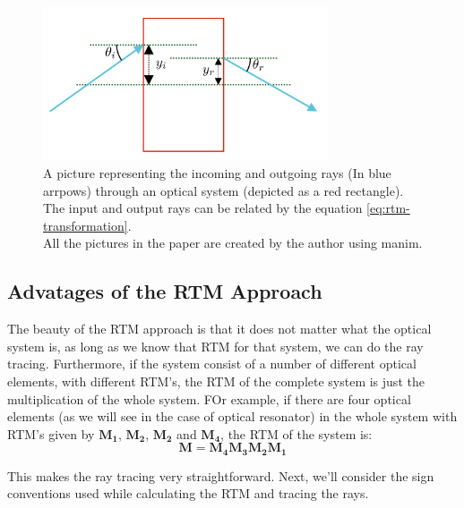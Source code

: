 \documentclass[12pt]{article}
\begin{document}
\begin{figure}[h]
    \centering
    \includegraphics[width=0.75\textwidth]{images/box_c.png}
    \caption{A picture representing the incoming and outgoing rays (In blue arrpows) through an optical system (depicted as a red rectangle). The input and output rays can be related by the equation \ref{eq:rtm-transformation}.\\{All the pictures in the paper are created by the author using {\color{cyan}manim}}\cite{manim}.}
    \label{fig:rtm-box}
\end{figure}
\subsection{Advatages of the RTM Approach}

The beauty of the RTM approach is that it does not matter what the optical system is, as long as we know that RTM for that system, we can do the ray tracing. Furthermore, if the system consist of a number of different optical elements, with different RTM's, the RTM of the complete system is just the multiplication of the whole system. FOr example, if there are four optical elements (as we will see in the case of optical resonator) in the whole system with RTM's given by \(\mathbf{M_1}\), \(\mathbf{M_2}\), \(\mathbf{M_2}\) and \(\mathbf{M_4}\), the RTM of the system is:
\begin{equation*}
    \mathbf{M} = \mathbf{M_4}\mathbf{M_3}\mathbf{M_2}\mathbf{M_1}
\end{equation*}

This makes the ray tracing very straightforward. Next, we'll consider the sign conventions used while calculating the RTM and tracing the rays.
\end{document}
